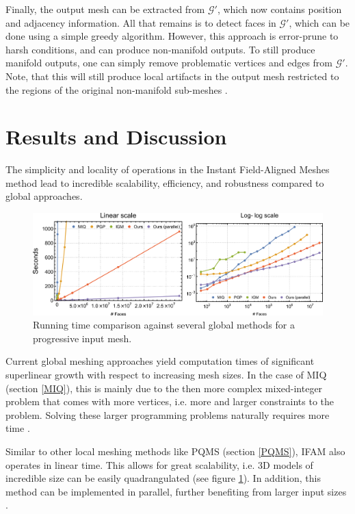 \documentclass{ACGSeminar}
\begin{document}
Finally, the output mesh can be extracted from $\mathcal{G}'$, which now contains position and adjacency information. All that remains is to detect faces in $\mathcal{G}'$, which can be done using a simple greedy algorithm. However, this approach is error-prune to harsh conditions, and can produce non-manifold outputs. To still produce manifold outputs, one can simply remove problematic vertices and edges from $\mathcal{G}'$. Note, that this will still produce local artifacts in the output mesh restricted to the regions of the original non-manifold sub-meshes \cite{jakob2015instant}.

\section{Results and Discussion}
The simplicity and locality of operations in the Instant Field-Aligned Meshes method lead to incredible scalability, efficiency, and robustness compared to global approaches.

\begin{figure}[htb!]
	\begin{centering}
		\includegraphics[width=12cm]{img/computation-time.png}\par
	\end{centering}
	\caption{Running time comparison against several global methods for a progressive input mesh. \cite{jakob2015instant}}
	\label{fig:computation-time}
\end{figure}

Current global meshing approaches yield computation times of significant superlinear growth with respect to increasing mesh sizes. In the case of MIQ (section \ref{MIQ}), this is mainly due to the then more complex mixed-integer problem that comes with more vertices, i.e. more and larger constraints to the problem. Solving these larger programming problems naturally requires more time \cite{jakob2015instant,bommes2009mixed}.

Similar to other local meshing methods like PQMS (section \ref{PQMS}), IFAM also operates in linear time. This allows for great scalability, i.e. 3D models of incredible size can be easily quadrangulated (see figure \ref{fig:computation-time}). In addition, this method can be implemented in parallel, further benefiting from larger input sizes \cite{jakob2015instant}.\bigskip
\end{document}
